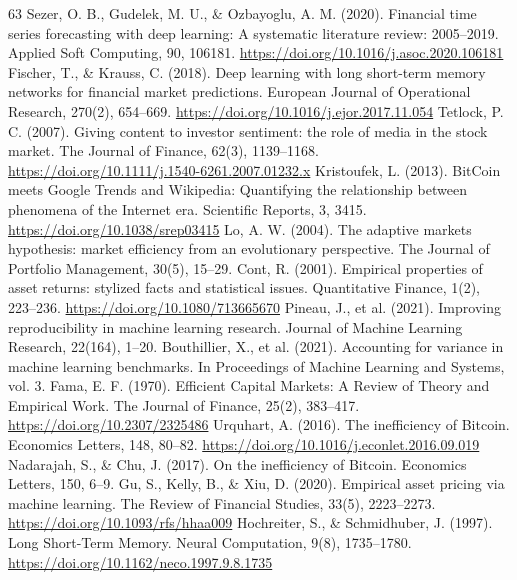 \begin{thebibliography}{63}
     Sezer, O. B., Gudelek, M. U., \& Ozbayoglu, A. M. (2020). Financial time series forecasting with deep learning: A systematic literature review: 2005--2019. Applied Soft Computing, 90, 106181. \url{https://doi.org/10.1016/j.asoc.2020.106181}
     Fischer, T., \& Krauss, C. (2018). Deep learning with long short-term memory networks for financial market predictions. European Journal of Operational Research, 270(2), 654--669. \url{https://doi.org/10.1016/j.ejor.2017.11.054}
     Tetlock, P. C. (2007). Giving content to investor sentiment: the role of media in the stock market. The Journal of Finance, 62(3), 1139--1168. \url{https://doi.org/10.1111/j.1540-6261.2007.01232.x}
     Kristoufek, L. (2013). BitCoin meets Google Trends and Wikipedia: Quantifying the relationship between phenomena of the Internet era. Scientific Reports, 3, 3415. \url{https://doi.org/10.1038/srep03415}
     Lo, A. W. (2004). The adaptive markets hypothesis: market efficiency from an evolutionary perspective. The Journal of Portfolio Management, 30(5), 15--29.
     Cont, R. (2001). Empirical properties of asset returns: stylized facts and statistical issues. Quantitative Finance, 1(2), 223--236. \url{https://doi.org/10.1080/713665670}
     Pineau, J., et al. (2021). Improving reproducibility in machine learning research. Journal of Machine Learning Research, 22(164), 1--20.
     Bouthillier, X., et al. (2021). Accounting for variance in machine learning benchmarks. In Proceedings of Machine Learning and Systems, vol. 3.
     Fama, E. F. (1970). Efficient Capital Markets: A Review of Theory and Empirical Work. The Journal of Finance, 25(2), 383--417. \url{https://doi.org/10.2307/2325486}
     Urquhart, A. (2016). The inefficiency of Bitcoin. Economics Letters, 148, 80--82. \url{https://doi.org/10.1016/j.econlet.2016.09.019}
     Nadarajah, S., \& Chu, J. (2017). On the inefficiency of Bitcoin. Economics Letters, 150, 6--9.
     Gu, S., Kelly, B., \& Xiu, D. (2020). Empirical asset pricing via machine learning. The Review of Financial Studies, 33(5), 2223--2273. \url{https://doi.org/10.1093/rfs/hhaa009}
     Hochreiter, S., \& Schmidhuber, J. (1997). Long Short-Term Memory. Neural Computation, 9(8), 1735--1780. \url{https://doi.org/10.1162/neco.1997.9.8.1735}

\end{thebibliography}
